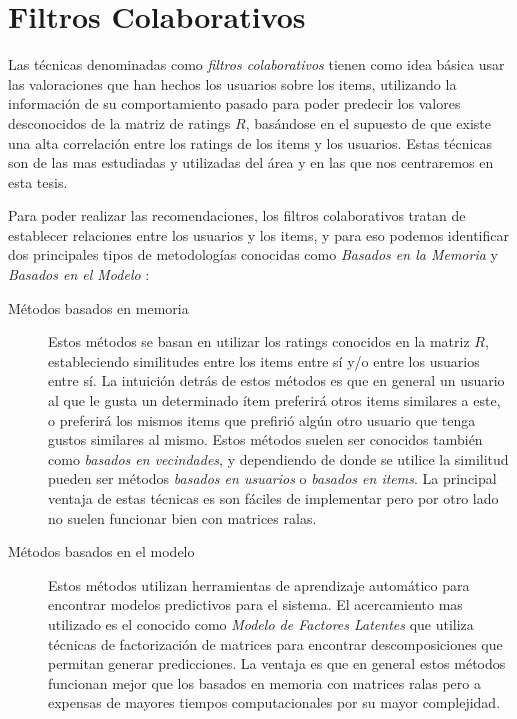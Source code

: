 \documentclass[hidelinks,12pt,a4paper]{book}
\theoremstyle{plain}
\theoremstyle{definition}
\begin{document}
\section{Filtros Colaborativos}

Las técnicas denominadas como \textit{filtros colaborativos} tienen como idea básica usar las valoraciones que han hechos los usuarios sobre los items, utilizando la información de su comportamiento pasado para poder predecir los valores desconocidos de la matriz de ratings $R$, basándose en el supuesto de que existe una alta correlación entre los ratings de los items y los usuarios\cite{agg}. Estas técnicas son de las mas estudiadas y utilizadas del área y en las que nos centraremos en esta tesis.

Para poder realizar las recomendaciones, los filtros colaborativos tratan de establecer relaciones entre los usuarios y los items, y para eso podemos identificar dos principales tipos de metodologías conocidas como \textit{Basados en la Memoria} y \textit{Basados en el Modelo} \cite{agg}\cite{cacheda2011comparison}:

\begin{description}
\item [Métodos basados en memoria] Estos métodos se basan en utilizar los ratings conocidos en la matriz $R$, estableciendo similitudes entre los items entre sí y/o entre los usuarios entre sí. La intuición detrás de estos métodos es que en general un usuario al que le gusta un determinado ítem preferirá otros items similares a este, o preferirá los mismos items que prefirió algún otro usuario que tenga gustos similares al mismo. Estos métodos suelen ser conocidos también como \textit{basados en vecindades}, y dependiendo de donde se utilice la similitud pueden ser métodos \textit{basados en usuarios} o \textit{basados en items}. La principal ventaja de estas técnicas es son fáciles de implementar pero por otro lado no suelen funcionar bien con matrices ralas.

\item[Métodos basados en el modelo] Estos métodos utilizan herramientas de aprendizaje automático para encontrar modelos predictivos para el sistema. El acercamiento mas utilizado es el conocido como \textit{Modelo de Factores Latentes} que utiliza técnicas de factorización de matrices para encontrar descomposiciones que permitan generar predicciones. La ventaja es que en general estos métodos funcionan mejor que los basados en memoria con matrices ralas pero a expensas de mayores tiempos computacionales por su mayor complejidad.
\end{description}
\end{document}
